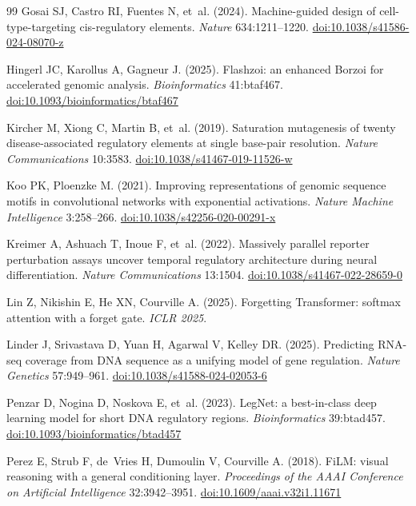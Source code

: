 \documentclass[10.5pt,a4paper]{article}
\begin{document}
\begin{thebibliography}{99}
 Gosai SJ, Castro RI, Fuentes N, et~al. (2024). Machine-guided design of cell-type-targeting cis-regulatory elements. \textit{Nature} 634:1211--1220. \href{https://doi.org/10.1038/s41586-024-08070-z}{doi:10.1038/s41586-024-08070-z}

 Hingerl JC, Karollus A, Gagneur J. (2025). Flashzoi: an enhanced Borzoi for accelerated genomic analysis. \textit{Bioinformatics} 41:btaf467. \href{https://doi.org/10.1093/bioinformatics/btaf467}{doi:10.1093/bioinformatics/btaf467}

 Kircher M, Xiong C, Martin B, et~al. (2019). Saturation mutagenesis of twenty disease-associated regulatory elements at single base-pair resolution. \textit{Nature Communications} 10:3583. \href{https://doi.org/10.1038/s41467-019-11526-w}{doi:10.1038/s41467-019-11526-w}

 Koo PK, Ploenzke M. (2021). Improving representations of genomic sequence motifs in convolutional networks with exponential activations. \textit{Nature Machine Intelligence} 3:258--266. \href{https://doi.org/10.1038/s42256-020-00291-x}{doi:10.1038/s42256-020-00291-x}

 Kreimer A, Ashuach T, Inoue F, et~al. (2022). Massively parallel reporter perturbation assays uncover temporal regulatory architecture during neural differentiation. \textit{Nature Communications} 13:1504. \href{https://doi.org/10.1038/s41467-022-28659-0}{doi:10.1038/s41467-022-28659-0}

 Lin Z, Nikishin E, He XN, Courville A. (2025). Forgetting Transformer: softmax attention with a forget gate. \textit{ICLR 2025}.

 Linder J, Srivastava D, Yuan H, Agarwal V, Kelley DR. (2025). Predicting RNA-seq coverage from DNA sequence as a unifying model of gene regulation. \textit{Nature Genetics} 57:949--961. \href{https://doi.org/10.1038/s41588-024-02053-6}{doi:10.1038/s41588-024-02053-6}

 Penzar D, Nogina D, Noskova E, et~al. (2023). LegNet: a best-in-class deep learning model for short DNA regulatory regions. \textit{Bioinformatics} 39:btad457. \href{https://doi.org/10.1093/bioinformatics/btad457}{doi:10.1093/bioinformatics/btad457}

 Perez E, Strub F, de~Vries H, Dumoulin V, Courville A. (2018). FiLM: visual reasoning with a general conditioning layer. \textit{Proceedings of the AAAI Conference on Artificial Intelligence} 32:3942--3951. \href{https://doi.org/10.1609/aaai.v32i1.11671}{doi:10.1609/aaai.v32i1.11671}


\end{thebibliography}
\end{document}
